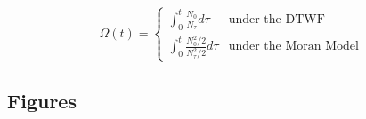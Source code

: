 \documentclass[11pt]{article}
\begin{document}
\begin{equation*}
	\Omega(t) = \begin{cases}
		\int_{0}^t \frac{N_0}{N_\tau} d\tau &\text{under the DTWF}\\[2ex]
		\int_{0}^t \frac{N_0^2/2}{N_\tau^2/2} d\tau  &\text{under the Moran Model}
	\end{cases}
\end{equation*}









\newpage

\subsection{Figures}
\end{document}

